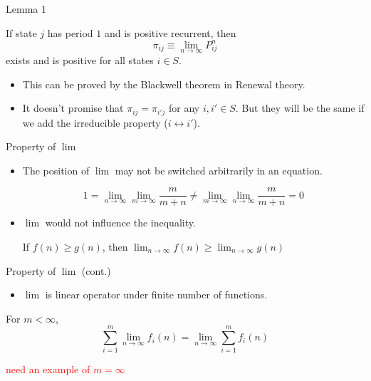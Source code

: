 \documentclass[mathserif]{beamer}
\begin{document}
\begin{frame}{Lemma 1}
	\begin{lemma}
		If state $j$ has period $1$ and is positive recurrent, then
		\[
		\pi_{ij} \equiv \lim_{n \to \infty} P^n_{ij}
		\]
		exists and is positive for all states $i \in S$.
	\end{lemma}
	\begin{itemize}
		\item This can be proved by the Blackwell theorem in Renewal theory.
		\item It doesn't promise that $\pi_{ij} = \pi_{i'j}$ for any $i,i' \in S$.
			But they will be the same if we add the irreducible property ($i \leftrightarrow i'$).
	\end{itemize}
\end{frame}

\begin{frame}{Property of $\lim$}
	\begin{itemize}
		\item The position of $\lim$ may not be switched arbitrarily in an equation.
			\begin{example}
				\[
				1 = \lim_{n \to \infty}\lim_{m \to \infty} \frac{m}{m+n} \neq
				\lim_{m \to \infty}\lim_{n \to \infty} \frac{m}{m+n} = 0
				\]
			\end{example}
		\item $\lim$ would not influence the inequality.
			\begin{example}
				\begin{center}
					If $f(n) \geq g(n)$, then
					$\lim_{n \to \infty} f(n) \geq \lim_{n \to \infty} g(n)$
				\end{center}
			\end{example}
	\end{itemize}
\end{frame}

\begin{frame}{Property of $\lim$ (cont.)}
	\begin{itemize}
		\item $\lim$ is linear operator under finite number of functions.
	\end{itemize}
	\begin{example}
		For $m < \infty$,
		\[
		\sum_{i=1}^m \lim_{n \to \infty} f_i(n) = \lim_{n \to \infty} \sum_{i=1}^m f_i(n)
		\]
	\end{example}
	\textcolor{red}{need an example of $m = \infty$}
\end{frame}
\end{document}
